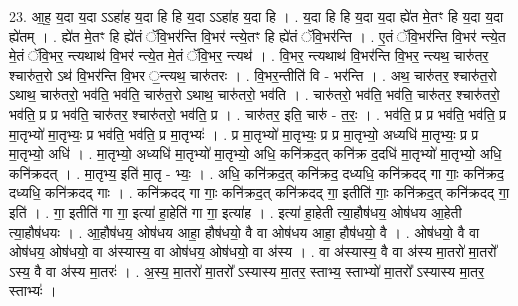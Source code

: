 \documentclass[17pt]{extarticle}
\begin{document}
23. आ॒ह॒ य॒दा य॒दा ऽऽहा॑ह य॒दा हि हि य॒दा ऽऽहा॑ह य॒दा हि । . य॒दा हि हि य॒दा य॒दा ह्ये॑त मे॒तꣳ हि य॒दा य॒दा ह्ये॑तम् । . ह्ये॑त मे॒तꣳ हि ह्ये॑तं ॅवि॒भर॑न्ति वि॒भर॑ न्त्ये॒तꣳ हि ह्ये॑तं ॅवि॒भर॑न्ति । . ए॒तं ॅवि॒भर॑न्ति वि॒भर॑ न्त्ये॒त मे॒तं ॅवि॒भर॒ न्त्यथाथ॑ वि॒भर॑ न्त्ये॒त मे॒तं ॅवि॒भर॒ न्त्यथ॑ । . वि॒भर॒ न्त्यथाथ॑ वि॒भर॑न्ति वि॒भर॒ न्त्यथ॒ चारु॑तर॒ श्चारु॑त॒रो ऽथ॑ वि॒भर॑न्ति वि॒भर ॒न्त्यथ॒ चारु॑तरः । . वि॒भर॒न्तीति॑ वि - भर॑न्ति । . अथ॒ चारु॑तर॒ श्चारु॑त॒रो ऽथाथ॒ चारु॑तरो॒ भव॑ति॒ भव॑ति॒ चारु॑त॒रो ऽथाथ॒ चारु॑तरो॒ भव॑ति । . चारु॑तरो॒ भव॑ति॒ भव॑ति॒ चारु॑तर॒ श्चारु॑तरो॒ भव॑ति॒ प्र प्र भव॑ति॒ चारु॑तर॒ श्चारु॑तरो॒ भव॑ति॒ प्र । . चारु॑तर॒ इति॒ चारु॑ - त॒रः॒ । . भव॑ति॒ प्र प्र भव॑ति॒ भव॑ति॒ प्र मा॒तृभ्यो॑ मा॒तृभ्यः॒ प्र भव॑ति॒ भव॑ति॒ प्र मा॒तृभ्यः॑ । . प्र मा॒तृभ्यो॑ मा॒तृभ्यः॒ प्र प्र मा॒तृभ्यो॒ अध्यधि॑ मा॒तृभ्यः॒ प्र प्र मा॒तृभ्यो॒ अधि॑ । . मा॒तृभ्यो॒ अध्यधि॑ मा॒तृभ्यो॑ मा॒तृभ्यो॒ अधि॒ कनि॑क्रद॒त् कनि॑क्र द॒दधि॑ मा॒तृभ्यो॑ मा॒तृभ्यो॒ अधि॒ कनि॑क्रदत् । . मा॒तृभ्य॒ इति॑ मा॒तृ - भ्यः॒ । . अधि॒ कनि॑क्रद॒त् कनि॑क्रद॒ दध्यधि॒ कनि॑क्रदद् गा गाः॒ कनि॑क्रद॒ दध्यधि॒ कनि॑क्रदद् गाः । . कनि॑क्रदद् गा गाः॒ कनि॑क्रद॒त् कनि॑क्रदद् गा॒ इतीति॑ गाः॒ कनि॑क्रद॒त् कनि॑क्रदद् गा॒ इति॑ । . गा॒ इतीति॑ गा गा॒ इत्या॑ हा॒हेति॑ गा गा॒ इत्या॑ह । . इत्या॑ हा॒हेती त्या॒हौष॑धय॒ ओष॑धय आ॒हेती त्या॒हौष॑धयः । . आ॒हौष॑धय॒ ओष॑धय आहा॒ हौष॑धयो॒ वै वा ओष॑धय आहा॒ हौष॑धयो॒ वै । . ओष॑धयो॒ वै वा ओष॑धय॒ ओष॑धयो॒ वा अ॑स्यास्य॒ वा ओष॑धय॒ ओष॑धयो॒ वा अ॑स्य । . वा अ॑स्यास्य॒ वै वा अ॑स्य मा॒तरो॑ मा॒तरो᳚ ऽस्य॒ वै वा अ॑स्य मा॒तरः॑ । . अ॒स्य॒ मा॒तरो॑ मा॒तरो᳚ ऽस्यास्य मा॒तर॒ स्ताभ्य॒ स्ताभ्यो॑ मा॒तरो᳚ ऽस्यास्य मा॒तर॒ स्ताभ्यः॑ । \newline
\end{document}
